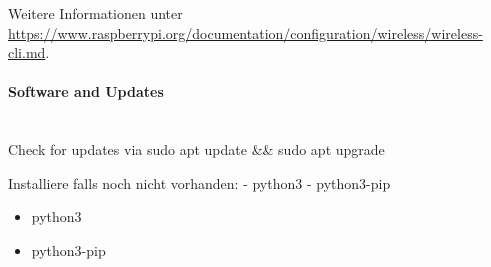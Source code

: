 Weitere Informationen unter \url{ https://www.raspberrypi.org/documentation/configuration/wireless/wireless-cli.md}.

\paragraph{Software and Updates} \hspace{0pt} \\
Check for updates via sudo apt update \&\& sudo apt upgrade

Installiere falls noch nicht vorhanden:
- python3
- python3-pip 
\begin{itemize}
  \item python3
  \item python3-pip
\end{itemize}


